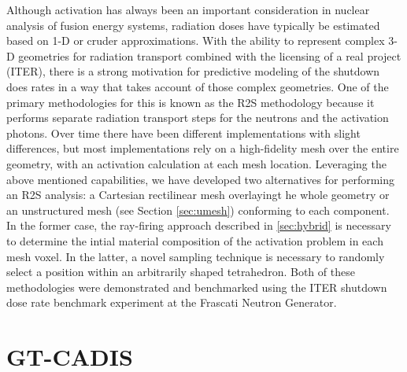 Although activation has always been an important consideration in nuclear
analysis of fusion energy systems, radiation doses have typically be estimated
based on 1-D or cruder approximations.  With the ability to represent complex
3-D geometries for radiation transport combined with the licensing of a real
project (ITER), there is a strong motivation for predictive modeling of the
shutdown does rates in a way that takes account of those complex geometries.
One of the primary methodologies for this is known as the \gls{R2S}
methodology because it performs separate radiation transport steps for the
neutrons and the activation photons.  Over time there have been different
implementations with slight differences, but most implementations rely on a
high-fidelity mesh over the entire geometry, with an activation calculation at
each mesh location.  Leveraging the above mentioned capabilities, we have
developed two alternatives for performing an \gls{R2S} analysis: a Cartesian
rectilinear mesh overlayingt he whole geometry or an unstructured mesh (see
Section \ref{sec:umesh}) conforming to each component.  In the former case,
the ray-firing approach described in \ref{sec:hybrid} is necessary to
determine the intial material composition of the activation problem in each
mesh voxel.  In the latter, a novel sampling technique is necessary to
randomly select a position within an arbitrarily shaped
tetrahedron. Both of these methodologies were
demonstrated and benchmarked using the ITER shutdown dose rate benchmark
experiment at the Frascati Neutron Generator.

\section{\acrfull{GT-CADIS}}

